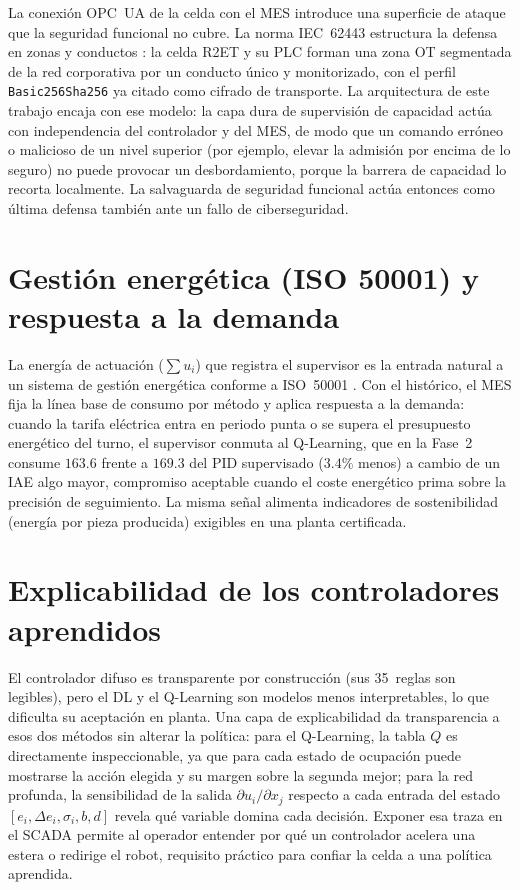 La conexión OPC~UA de la celda con el MES introduce una superficie de ataque que la seguridad funcional no cubre. La norma IEC~62443 estructura la defensa en zonas y conductos \cite{iec62443security}: la celda R2ET y su PLC forman una zona OT segmentada de la red corporativa por un conducto único y monitorizado, con el perfil \texttt{Basic256Sha256} ya citado como cifrado de transporte. La arquitectura de este trabajo encaja con ese modelo: la capa dura de supervisión de capacidad actúa con independencia del controlador y del MES, de modo que un comando erróneo o malicioso de un nivel superior (por ejemplo, elevar la admisión por encima de lo seguro) no puede provocar un desbordamiento, porque la barrera de capacidad lo recorta localmente. La salvaguarda de seguridad funcional actúa entonces como última defensa también ante un fallo de ciberseguridad.

\section{Gestión energética (ISO 50001) y respuesta a la demanda}

La energía de actuación ($\sum u_i$) que registra el supervisor es la entrada natural a un sistema de gestión energética conforme a ISO~50001 \cite{iso50001energy}. Con el histórico, el MES fija la línea base de consumo por método y aplica respuesta a la demanda: cuando la tarifa eléctrica entra en periodo punta o se supera el presupuesto energético del turno, el supervisor conmuta al Q-Learning, que en la Fase~2 consume $163.6$ frente a $169.3$ del PID supervisado ($3.4\%$ menos) a cambio de un IAE algo mayor, compromiso aceptable cuando el coste energético prima sobre la precisión de seguimiento. La misma señal alimenta indicadores de sostenibilidad (energía por pieza producida) exigibles en una planta certificada.

\section{Explicabilidad de los controladores aprendidos}

El controlador difuso es transparente por construcción (sus 35~reglas son legibles), pero el DL y el Q-Learning son modelos menos interpretables, lo que dificulta su aceptación en planta. Una capa de explicabilidad da transparencia a esos dos métodos sin alterar la política: para el Q-Learning, la tabla $Q$ es directamente inspeccionable, ya que para cada estado de ocupación puede mostrarse la acción elegida y su margen sobre la segunda mejor; para la red profunda, la sensibilidad de la salida $\partial u_i/\partial x_j$ respecto a cada entrada del estado $[e_i,\Delta e_i,\sigma_i,b,d]$ revela qué variable domina cada decisión. Exponer esa traza en el SCADA permite al operador entender por qué un controlador acelera una estera o redirige el robot, requisito práctico para confiar la celda a una política aprendida.

